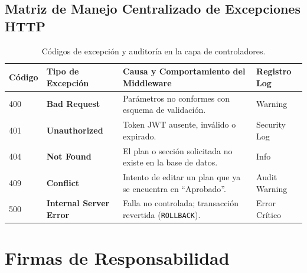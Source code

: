 \documentclass[12pt,a4paper]{article}
\begin{document}
\subsection{Matriz de Manejo Centralizado de Excepciones HTTP}
\begin{table}[H]
\centering
\small
\renewcommand{\arraystretch}{1.2}
\begin{tabularx}{\textwidth}{|>{\hsize=0.3\hsize\centering\arraybackslash\footnotesize}X|>{\hsize=0.9\hsize\raggedright\arraybackslash\bfseries\footnotesize}X|>{\hsize=2.3\hsize\raggedright\arraybackslash\footnotesize}X|>{\hsize=0.5\hsize\centering\arraybackslash\footnotesize}X|}
\hline
\rowcolor{tableheader}
\textbf{Código} & \textbf{Tipo de Excepción} & \textbf{Causa y Comportamiento del Middleware} & \textbf{Registro Log} \\
\hline
400 & Bad Request & Parámetros no conformes con esquema de validación. & Warning \\
\hline
401 & Unauthorized & Token JWT ausente, inválido o expirado. & Security Log \\
\hline
404 & Not Found & El plan o sección solicitada no existe en la base de datos. & Info \\
\hline
409 & Conflict & Intento de editar un plan que ya se encuentra en ``Aprobado''. & Audit Warning \\
\hline
500 & Internal Server Error & Falla no controlada; transacción revertida (\texttt{ROLLBACK}). & Error Crítico \\
\hline
\end{tabularx}
\caption{Códigos de excepción y auditoría en la capa de controladores.}
\end{table}

\section{Firmas de Responsabilidad}
\end{document}
